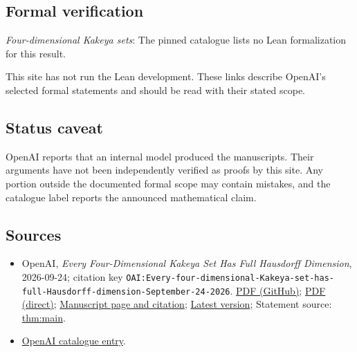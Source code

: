 \documentclass[11pt]{article}
\begin{document}
\subsection{Formal verification}
\textit{Four-dimensional Kakeya sets}: The pinned catalogue lists no Lean formalization for this result.

This site has not run the Lean development. These links describe OpenAI’s selected formal statements and should be read with their stated scope.

\subsection{Status caveat}
OpenAI reports that an internal model produced the manuscripts. Their arguments have not been independently verified as proofs by this site. Any portion outside the documented formal scope may contain mistakes, and the catalogue label reports the announced mathematical claim.

\subsection{Sources}
\begin{itemize}
\item OpenAI, \emph{Every Four-Dimensional Kakeya Set Has Full Hausdorff Dimension}, 2026-09-24; citation key \texttt{OAI:Every-four-dimensional-Kakeya-set-has-full-Hausdorff-dimension-September-24-2026}. \href{https://github.com/openai/math/blob/adc7f1241b42e322a6451854ab7e4b4c146bf78a/preprints/Every-four-dimensional-Kakeya-set-has-full-Hausdorff-dimension-September-24-2026/paper.pdf}{PDF (GitHub)}; \href{https://github.com/openai/math/raw/adc7f1241b42e322a6451854ab7e4b4c146bf78a/preprints/Every-four-dimensional-Kakeya-set-has-full-Hausdorff-dimension-September-24-2026/paper.pdf}{PDF (direct)}; \href{https://github.com/openai/math/blob/adc7f1241b42e322a6451854ab7e4b4c146bf78a/preprints/Every-four-dimensional-Kakeya-set-has-full-Hausdorff-dimension-September-24-2026/README.md}{Manuscript page and citation}; \href{https://github.com/openai/math/blob/main/preprints/Every-four-dimensional-Kakeya-set-has-full-Hausdorff-dimension-September-24-2026/paper.pdf}{Latest version}; Statement source: \href{https://github.com/openai/math/blob/adc7f1241b42e322a6451854ab7e4b4c146bf78a/preprints/Every-four-dimensional-Kakeya-set-has-full-Hausdorff-dimension-September-24-2026/build/sections/01-introduction.tex\#L8}{thm:main}.
\item \href{https://github.com/openai/math/blob/adc7f1241b42e322a6451854ab7e4b4c146bf78a/CONTENTS.md}{OpenAI catalogue entry}.
\end{itemize}
\end{document}
